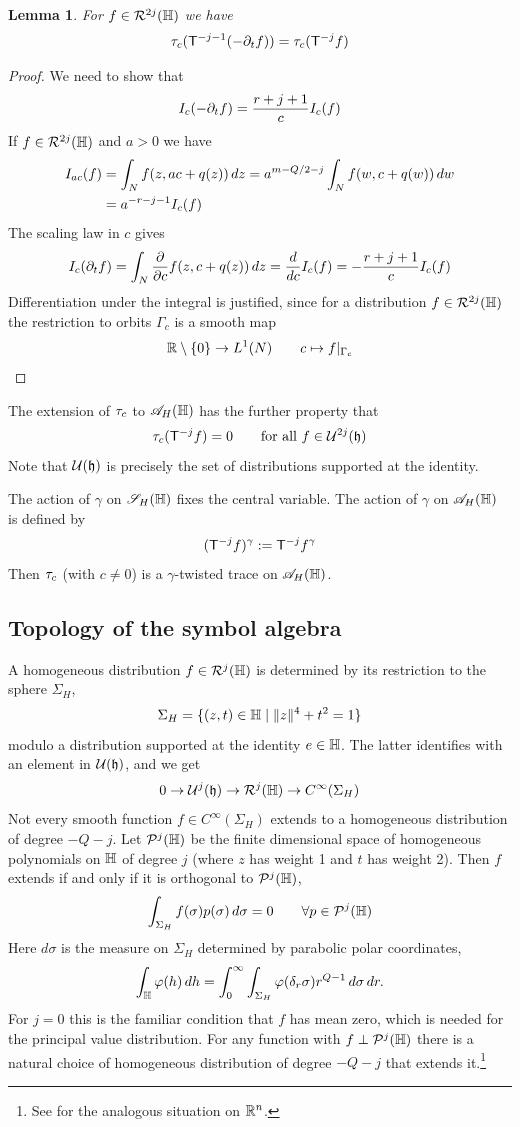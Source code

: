 \documentclass[11pt]{amsart}
\theoremstyle{plain}
\newtheorem{lemma}[theorem]{Lemma}
\theoremstyle{definition}
\theoremstyle{remark}
\begin{document}
\begin{lemma}\label{lem:tau_c of del_t f}
For $f\in \mathcal{R}^{2j}(\mathbb{H})$ we have
\[ \tau_{c}(\mathsf{T}^{-j-1}(-\partial_t f))=\tau_{c}(\mathsf{T}^{-j}f)\]
\end{lemma}
\begin{proof}
We need to show that
\[ I_{c}(-\partial_t f)=\frac{r+j+1}{c}I_{c}(f)\]
If $f\in \mathcal{R}^{2j}(\mathbb{H})$ and $a>0$ we have
\begin{align*}
      I_{ac}(f)
    &=\int_N f(z, ac+q(z))\,dz
    =a^{m-Q/2-j}\int_N f(w, c+q(w))\,dw\\
    &=a^{-r-j-1}I_{c}(f)
\end{align*}
The scaling law in $c$ gives
\[ I_{c}(\partial_t f)=\int_N \frac{\partial}{\partial c}f(z, c+q(z))\,dz=\frac{d}{dc}I_{c}(f)=-\frac{r+j+1}{c}I_{c}(f)\]
Differentiation under the integral is justified, since for a distribution $f\in\mathcal{R}^{2j}(\mathbb{H})$ the restriction to orbits $\Gamma_c$ is a smooth map
\[ {\mathbb{R}}\setminus\{0\}\to L^1(N)\qquad c\mapsto f|_{\Gamma_c}\]
\end{proof}

The extension of $\tau_{c}$ to ${\mathscr{A}}_H(\mathbb{H})$ has the further property that
\[ \tau_{c}(\mathsf{T}^{-j}f)=0\qquad \text{for all } f\in {\mathcal{U}}^{2j}(\mathfrak{h})\]
Note that ${\mathcal{U}}(\mathfrak{h})$ is precisely the set of distributions supported at the identity.

The action of  $\gamma$ on ${\mathscr{S}_H}(\mathbb{H})$ fixes the central variable.
The action of $\gamma$ on ${\mathscr{A}}_H(\mathbb{H})$ is defined by
\[ (\mathsf{T}^{-j}f)^\gamma:=\mathsf{T}^{-j}f^\gamma\]
Then $\tau_{c}$ (with $c\ne 0$)  is a $\gamma$-twisted trace on ${\mathscr{A}}_H(\mathbb{H})$.

\subsection{Topology of the symbol algebra}\label{sec:topology}

A homogeneous distribution $f\in \mathcal{R}^j(\mathbb{H})$
is determined by its restriction to the sphere $\Sigma_H$,
\[ \Sigma_H = \{(z,t)\in \mathbb{H}\mid \|z\|^4+t^2=1\}\]
modulo a distribution supported at the identity $e\in \mathbb{H}$.
The latter identifies with an element in ${\mathcal{U}}(\mathfrak{h})$, and we get
\[ 0\to {\mathcal{U}}^j(\mathfrak{h})\to \mathcal{R}^j(\mathbb{H})\to C^\infty(\Sigma_H)\]
Not every smooth function $f\in C^\infty(\Sigma_H)$ extends to a homogeneous distribution of degree $-Q-j$.
Let $\mathcal{P}^j(\mathbb{H})$ be the finite dimensional space of homogeneous polynomials on $\mathbb{H}$ of degree $j$ (where $z$ has weight 1 and $t$ has weight 2).
Then $f$ extends if and only if it is orthogonal to $\mathcal{P}^j(\mathbb{H})$,
\[ \int_{\Sigma_H} f(\sigma)p(\sigma)\,d\sigma=0\qquad \forall p\in \mathcal P^j(\mathbb{H})\]
Here $d\sigma$ is the measure on $\Sigma_H$ determined by parabolic polar coordinates,
\[
 \int_{\mathbb{H}}\varphi(h)\,dh
 =\int_0^\infty\int_{\Sigma_H}
    \varphi(\delta_r\sigma)r^{Q-1}\,d\sigma\,dr.
\]
For $j=0$ this is the familiar condition that $f$ has mean zero, which is needed for the principal value distribution.
For any function with $f\perp \mathcal{P}^j(\mathbb{H})$ there is a natural choice of homogeneous distribution of degree $-Q-j$ that extends it.\footnote{See \cite[Section 3.2]{HormI} for the analogous situation on ${\mathbb{R}}^n$.}
\end{document}
